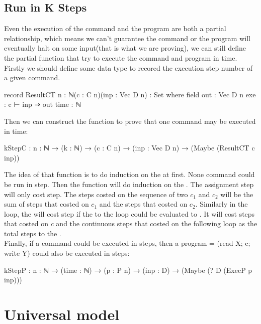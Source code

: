 \subsection{Run \WHILE in K Steps}
Even the execution of the command  and the program  are both a partial relationship, which means we can't guarantee the command or the program will eventually halt on some input(that is what we are proving),
we can still define the partial function that try to execute the command  and program  in  time.\\
Firstly we should define some data type to recored the execution step number of a given command.
\begin{code}
record ResultCT {n : ℕ}(c : C n)(inp : Vec D n) : Set where
  field
    out  : Vec D n
    exe  : c ⊢ inp ⇒ out
    time : ℕ
\end{code}
Then we can construct the function to prove that one command may be executed in  time:
\begin{code}
kStepC : {n : ℕ} → (k : ℕ) → (c : C n) → (inp : Vec D n) 
	→ (Maybe (ResultCT c inp))
\end{code}
The idea of that function is to do induction on the  at first.
None command could be run in  step.
Then the function will do induction on the .
The assignment step will only cost  step.
The steps costed on the sequence of two  $c_1$ and $c_2$ will be the sum of steps that costed on $c_1$ and the steps that costed on $c_2$.
Similarly in the  loop, the  will cost  step if the  to the  loop could be evaluated to .
It will cost steps that costed on $c$ and the continuous steps that costed on the following  loop as the total steps to the .\\
Finally, if a command  could be executed in  steps, then a program  = (read X; c; write Y) could also be executed in  steps:
\begin{code}
kStepP : {n : ℕ} → (time : ℕ) → (p : P n) → (inp : D) 
	→ (Maybe (? D (ExecP p inp)))
\end{code}

\section{Universal \WHILE model}\label{universal-I}
